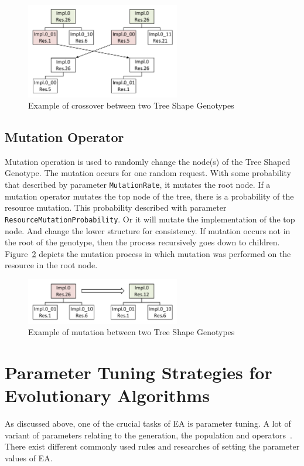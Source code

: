 \begin{figure}
	\centering
	\includegraphics[width=0.6\textwidth]{images/GeneticSolverCrossover.pdf}
	\caption[Crossover in Tree Shape Genotype]{Example of crossover between two Tree Shape Genotypes}
	\label{fig:GeneticSolverCrossover}
\end{figure}



\subsection{Mutation Operator}
\label{sec:GeneticSolverMutation}
Mutation operation is used to randomly change the node(s) of the Tree Shaped Genotype.
The mutation occurs for one random request. With some probability that described by parameter \texttt{MutationRate}, it mutates the root node. If a mutation operator mutates the top node of the tree, there is a probability of the resource mutation. This probability described with parameter \texttt{ResourceMutationProbability}. Or it will mutate the implementation of the top node. And change the lower structure for consistency. If mutation occurs not in the root of the genotype, then the process recursively goes down to children.  Figure~\ref{fig:GeneticSolverMutation} depicts the mutation process in which mutation was performed on the resource 
in the root node.

\begin{figure}
	\centering
	\includegraphics[width=0.6\textwidth]{images/GeneticSolverMutation.pdf}
	\caption[Mutation in Tree Shape Genotype]{Example of mutation between two Tree Shape Genotypes}
	\label{fig:GeneticSolverMutation}
\end{figure}

\section{Parameter Tuning Strategies for Evolutionary Algorithms}\label{sec:Parameter Tuning Strategies}
As discussed above, one of the crucial tasks of EA is parameter tuning. A lot of variant of parameters relating to the generation, the population and operators~\cite{sipper2018investigating}. There exist different commonly used rules and researches of setting the parameter values of EA.

